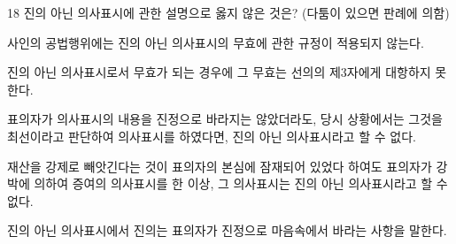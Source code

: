 \begin{question}{18}
진의 아닌 의사표시에 관한 설명으로 옳지 않은 것은? (다툼이 있으면 판례에 의함)
\begin{choices}
  \item 사인의 공법행위에는 진의 아닌 의사표시의 무효에 관한 규정이 적용되지 않는다.
  \item 진의 아닌 의사표시로서 무효가 되는 경우에 그 무효는 선의의 제3자에게 대항하지 못한다.
  \item 표의자가 의사표시의 내용을 진정으로 바라지는 않았더라도, 당시 상황에서는 그것을 최선이라고 판단하여 의사표시를 하였다면, 진의 아닌 의사표시라고 할 수 없다.
  \item 재산을 강제로 빼앗긴다는 것이 표의자의 본심에 잠재되어 있었다 하여도 표의자가 강박에 의하여 증여의 의사표시를 한 이상, 그 의사표시는 진의 아닌 의사표시라고 할 수 없다.
  \item 진의 아닌 의사표시에서 진의는 표의자가 진정으로 마음속에서 바라는 사항을 말한다.
\end{choices}
\end{question}
